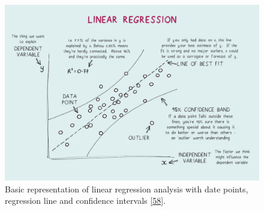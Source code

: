 \documentclass[a4paper,11pt]{article}
\begin{document}
\begin{figure}

{\centering \includegraphics[width=1\linewidth]{figures/regression} 

}

\caption{Basic representation of linear regression analysis with date points, regression line and confidence intervals {[}\protect\hyperlink{ref-JasonWong.2020}{58}{]}.}\label{fig:regression}
\end{figure}
\end{document}
